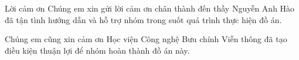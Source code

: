 \begin{preface}{Lời cảm ơn}
Chúng em xin gửi lời cảm ơn chân thành đến thầy Nguyễn Anh Hào đã tận tình hướng dẫn và hỗ trợ nhóm trong suốt quá trình thực hiện đồ án.

Chúng em cũng xin cảm ơn Học viện Công nghệ Bưu chính Viễn thông đã tạo điều kiện thuận lợi để nhóm hoàn thành đồ án này.
\end{preface}
